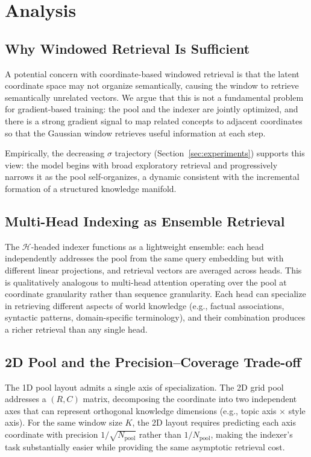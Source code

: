 \documentclass[11pt]{article}
\begin{document}
\section{Analysis}
\label{sec:analysis}

\subsection{Why Windowed Retrieval Is Sufficient}

A potential concern with coordinate-based windowed retrieval is that the
latent coordinate space may not organize semantically, causing the window
to retrieve semantically unrelated vectors.
We argue that this is not a fundamental problem for gradient-based training:
the pool and the indexer are jointly optimized, and there is a strong gradient
signal to map related concepts to adjacent coordinates so that the Gaussian
window retrieves useful information at each step.

Empirically, the decreasing $\sigma$ trajectory (Section~\ref{sec:experiments})
supports this view: the model begins with broad exploratory retrieval and
progressively narrows it as the pool self-organizes, a dynamic consistent
with the incremental formation of a structured knowledge manifold.

\subsection{Multi-Head Indexing as Ensemble Retrieval}

The $\mathcal{H}$-headed indexer functions as a lightweight ensemble:
each head independently addresses the pool from the same query embedding
but with different linear projections, and retrieval vectors are averaged
across heads.
This is qualitatively analogous to multi-head attention operating over the
pool at coordinate granularity rather than sequence granularity.
Each head can specialize in retrieving different aspects of world knowledge
(e.g., factual associations, syntactic patterns, domain-specific terminology),
and their combination produces a richer retrieval than any single head.

\subsection{2D Pool and the Precision–Coverage Trade-off}

The 1D pool layout admits a single axis of specialization.
The 2D grid pool addresses a $(R, C)$ matrix, decomposing the coordinate
into two independent axes that can represent orthogonal knowledge dimensions
(e.g., topic axis $\times$ style axis).
For the same window size $K$, the 2D layout requires predicting each axis
coordinate with precision $1/\sqrt{N_{\text{pool}}}$ rather than
$1/N_{\text{pool}}$, making the indexer's task substantially easier while
providing the same asymptotic retrieval cost.
\end{document}
